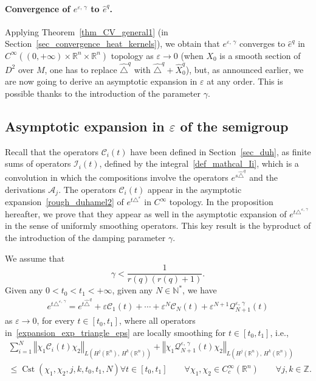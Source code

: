 \documentclass[10pt]{amsart}
\theoremstyle{definition}\newtheorem{defi}[theo]{Definition}\newtheorem{rema}[theo]{Remark}\newtheorem{exam}[theo]{Example}\newtheorem{exem}[theo]{Example}\newtheorem{nota}[theo]{Notation}
\newcommand*\R{\mathbb{R}}
\newcommand*\N{\mathbb{N}}
\newcommand*\Z{\mathbb{Z}}
\newcommand{\calQ}{\mathcal{Q}}
\newcommand{\calA}{\mathcal{A}}
\newcommand{\calC}{\mathcal{C}}
\newcommand{\calI}{\mathcal{I}}
\DeclareMathOperator{\Cst}{Cst}
\renewcommand{\leq}{\leqslant}
\let\oldforall\forall
\renewcommand*{\forall}{\mathrel{\oldforall}}
\begin{document}
\paragraph{Convergence of $e^{\varepsilon,\,\gamma}$ to $\widehat{e}^{q}$.}
Applying Theorem~\ref{thm_CV_general1} (in Section~\ref{sec_convergence_heat_kernels}), we obtain that $e^{\varepsilon,\,\gamma}$ converges to $\widehat{e}^{q}$ in $C^\infty((0,+\infty)\times\R^n\times\R^n)$ topology as $\varepsilon\rightarrow 0$ (when $X_0$ is a smooth section of $D^2$ over $M$, one has to replace $\widehat{\triangle}^{q}$ with $\widehat{\triangle}^{q} +\widehat{X}_0^{q}$), but, as announced earlier, we are now going to derive an asymptotic expansion in $\varepsilon$ at any order. This is possible thanks to the introduction of the parameter $\gamma$.



\subsection{Asymptotic expansion in \texorpdfstring{$\varepsilon$}{varepsilon} of the semigroup}\label{sec:asymptotic_expansion_epsilongamma}
Recall that the operators $\calC_i(t)$ have been defined in Section~\ref{sec_duh}, as finite sums of operators $\calI_i(t)$, defined by the integral~\eqref{def_mathcal_Ii}, which is a convolution in which the compositions involve the operators $e^{s\widehat{\triangle}^{q}}$ and the derivations $\calA_j$. The operators $\calC_i(t)$ appear in the asymptotic expansion~\eqref{rough_duhamel2} of $e^{t\triangle^\varepsilon}$ in $C^\infty$ topology. In the proposition hereafter, we prove that they appear as well in the asymptotic expansion of $e^{t\triangle^{\varepsilon,\,\gamma}}$ in the sense of uniformly smoothing operators. This key result is the byproduct of the introduction of the damping parameter $\gamma$.

\begin{prop}\label{prop_expansion_semigroup_epsgam}
We assume that
\[
\gamma<\frac{1}{r(q)(r(q)+1)}.
\]
Given any $0<t_0<t_1<+\infty$, given any $N\in\N^*$, we have
\begin{equation}\label{expansion_exp_triangle_eps}
\begin{split}
e^{t\triangle^{\varepsilon,\,\gamma}} = e^{t \widehat{\triangle}^{q}} + \varepsilon \calC_1(t) + \cdots + \varepsilon^N \calC_N(t) + \varepsilon^{N+1} \calQ_{N+1}^{\varepsilon,\,\gamma}(t)
\end{split}
\end{equation}
as $\varepsilon\rightarrow 0$, for every $t\in[t_0,t_1]$, where all operators in~\eqref{expansion_exp_triangle_eps} are locally smoothing for $t\in[t_0,t_1]$, i.e.,
\begin{multline*}
\sum_{i=1}^N\left\Vert\chi_1\calC_i(t)\chi_2\right\Vert_{L\left(H^j(\R^n),\,H^k(\R^n)\right)} + \left\Vert\chi_1\calQ_{N+1}^{\varepsilon,\,\gamma}(t)\chi_2\right\Vert_{L\left(H^j(\R^n),\,H^k(\R^n)\right)} \\
\leq \Cst\left(\chi_1,\chi_2,j,k,t_0,t_1,N\right) 
\forall t\in[t_0,t_1] \qquad \forall \chi_1,\chi_2\in C^\infty_c(\R^n) \qquad\forall j,k\in\Z.
\end{multline*}
\end{prop}
\end{document}
